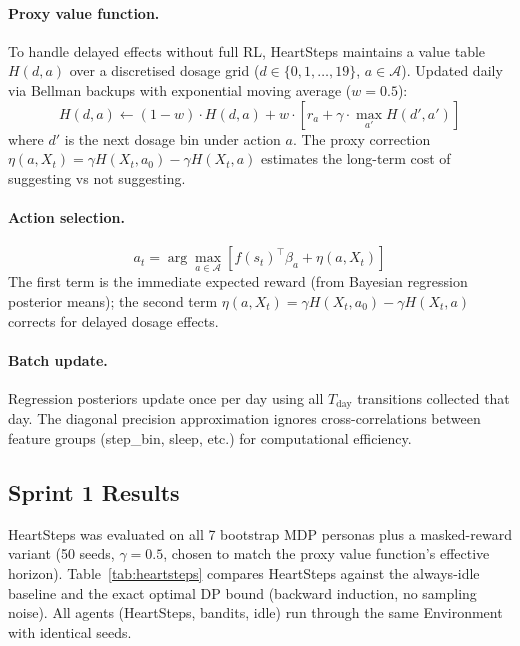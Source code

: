 \documentclass[11pt]{article}
\begin{document}
\paragraph{Proxy value function.}
To handle delayed effects without full RL, HeartSteps maintains a value table $H(d, a)$ over a discretised dosage grid ($d \in \{0, 1, \dots, 19\}$, $a \in \mathcal{A}$). Updated daily via Bellman backups with exponential moving average ($w = 0.5$):
\[
H(d, a) \leftarrow (1-w) \cdot H(d, a) + w \cdot \left[ r_a + \gamma \cdot \max_{a'} H(d', a') \right]
\]
where $d'$ is the next dosage bin under action $a$. The proxy correction $\eta(a, X_t) = \gamma H(X_t, a_0) - \gamma H(X_t, a)$ estimates the long-term cost of suggesting vs not suggesting.

\paragraph{Action selection.}
\[
a_t = \arg\max_{a \in \mathcal{A}} \left[ f(s_t)^\top \hat{\beta}_a + \eta(a, X_t) \right]
\]
The first term is the immediate expected reward (from Bayesian regression posterior means); the second term $\eta(a, X_t) = \gamma H(X_t, a_0) - \gamma H(X_t, a)$ corrects for delayed dosage effects.

\paragraph{Batch update.}
Regression posteriors update once per day using all $T_{\text{day}}$ transitions collected that day. The diagonal precision approximation ignores cross-correlations between feature groups (step\_bin, sleep, etc.) for computational efficiency.

\subsection{Sprint 1 Results}

HeartSteps was evaluated on all 7 bootstrap MDP personas plus a masked-reward variant (50 seeds, $\gamma = 0.5$, chosen to match the proxy value function's effective horizon). Table~\ref{tab:heartsteps} compares HeartSteps against the always-idle baseline and the exact optimal DP bound (backward induction, no sampling noise). All agents (HeartSteps, bandits, idle) run through the same Environment with identical seeds.
\end{document}
